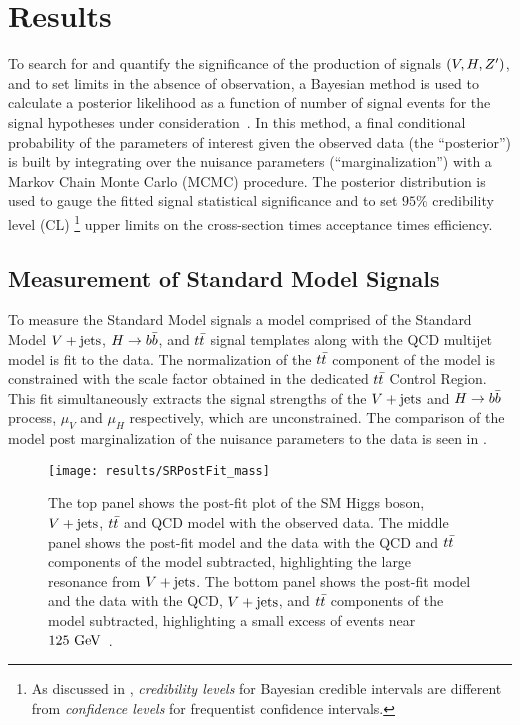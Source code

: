 \chapter{Results}\label{chapter:results}

To search for and quantify the significance of the production of signals $\left(V, H, Z^{\prime}\right)$, and to set limits in the absence of observation, a Bayesian method is used to calculate a posterior likelihood as a function of number of signal events for the signal hypotheses under consideration~\cite{EXOT-2010-07}.
In this method, a final conditional probability of the parameters of interest given the observed data (the ``posterior'') is built by integrating over the nuisance parameters (``marginalization'') with a Markov Chain Monte Carlo (\Gls{MCMC}) procedure.
The posterior distribution is used to gauge the fitted signal statistical significance and to set $95\%$ credibility level (CL)%
\footnote{As discussed in , \emph{credibility levels} for Bayesian credible intervals are different from \emph{confidence levels} for frequentist confidence intervals.}
upper limits on the cross-section times acceptance times efficiency.

\section{Measurement of Standard Model Signals}

To measure the Standard Model signals a model comprised of the Standard Model $V + \text{jets}$, $H \to b\bar{b}$, and $t\bar{t}$ signal templates along with the QCD multijet model is fit to the data.
The normalization of the $t\bar{t}$ component of the model is constrained with the scale factor obtained in the dedicated $t\bar{t}$ Control Region.
This fit simultaneously extracts the signal strengths of the $V + \text{jets}$ and $H \to b\bar{b}$ process, $\mu_{V}$ and $\mu_{H}$ respectively, which are unconstrained.
The comparison of the model post marginalization of the nuisance parameters to the data is seen in .

\begin{figure}[htbp]
 \centering
 \texttt{[image: results/SRPostFit\_mass]}
 \caption[Plot of post-fit model with observed data and with model components subtracted.]{%
  The top panel shows the post-fit plot of the SM Higgs boson, $V + \text{jets}$, $t\bar{t}$ and QCD model with the observed data.
  The middle panel shows the post-fit model and the data with the QCD and $t\bar{t}$ components of the model subtracted, highlighting the large resonance from $V + \text{jets}$.
  The bottom panel shows the post-fit model and the data with the QCD, $V + \text{jets}$, and $t\bar{t}$ components of the model subtracted, highlighting a small excess of events near $125~\mathrm{GeV}$~\cite{ATLAS-CONF-2018-052}.
 }
 \label{fig:post_fit}
\end{figure}

